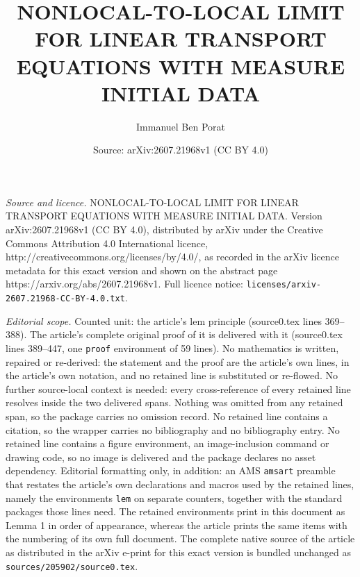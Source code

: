 \documentclass[10pt,a4paper]{amsart}
\title{NONLOCAL-TO-LOCAL LIMIT FOR LINEAR TRANSPORT EQUATIONS WITH MEASURE INITIAL DATA}
\author{Immanuel Ben Porat}
\date{Source: arXiv:2607.21968v1 (CC BY 4.0)}
\begin{document}
\maketitle

\noindent\emph{Source and licence.} NONLOCAL-TO-LOCAL LIMIT FOR LINEAR TRANSPORT EQUATIONS WITH MEASURE INITIAL DATA. Version arXiv:2607.21968v1 (CC BY 4.0), distributed by arXiv under the Creative Commons Attribution 4.0 International licence, http://creativecommons.org/licenses/by/4.0/, as recorded in the arXiv licence metadata for this exact version and shown on the abstract page https://arxiv.org/abs/2607.21968v1. Full licence notice: \texttt{licenses/arxiv-2607.21968-CC-BY-4.0.txt}.\par\smallskip

\noindent\textit{Editorial scope.} Counted unit: the article's lem principle (source0.tex lines 369--388). The article's complete original proof of it is delivered with it (source0.tex lines 389--447, one \texttt{proof} environment of 59 lines). No mathematics is written, repaired or re-derived: the statement and the proof are the article's own lines, in the article's own notation, and no retained line is substituted or re-flowed.  No further source-local context is needed: every cross-reference of every retained line resolves inside the two delivered spans.  Nothing was omitted from any retained span, so the package carries no omission record.  No retained line contains a citation, so the wrapper carries no bibliography and no bibliography entry.  No retained line contains a figure environment, an image-inclusion command or drawing code, so no image is delivered and the package declares no asset dependency.  Editorial formatting only, in addition: an AMS \texttt{amsart} preamble that restates the article's own declarations and macros used by the retained lines, namely the environments \texttt{lem} on separate counters, together with the standard packages those lines need.  The retained environments print in this document as Lemma 1 in order of appearance, whereas the article prints the same items with the numbering of its own full document.  The complete native source of the article as distributed in the arXiv e-print for this exact version is bundled unchanged as \texttt{sources/205902/source0.tex}.
\end{document}
